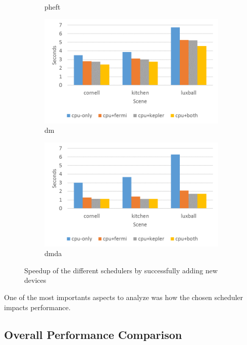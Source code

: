 \documentclass[main.tex]{subfiles}
\begin{document}
\begin{figure}[!htp]
\begin{subfigure}{.5\textwidth}
    \caption{pheft \label{fig:prof:starpu_sched_pheft}}
  \end{subfigure}
  \begin{subfigure}{.5\textwidth}
    \centering
    \includegraphics[width=\linewidth]{profiling/starpu_sched_dm}
    \caption{dm \label{fig:prof:starpu_sched_dm}}
  \end{subfigure}%
  \begin{subfigure}{.5\textwidth}
    \centering
    \includegraphics[width=\linewidth]{profiling/starpu_sched_dmda}
    \caption{dmda \label{fig:prof:starpu_sched_dmda}}
  \end{subfigure}
  \caption{Speedup of the different schedulers by successfully adding new devices \label{fig:prof:starpu_scheds}}
\end{figure}

One of the most importants aspects to analyze was how the chosen scheduler impacts performance.

\subsection{Overall Performance Comparison}
\end{document}
